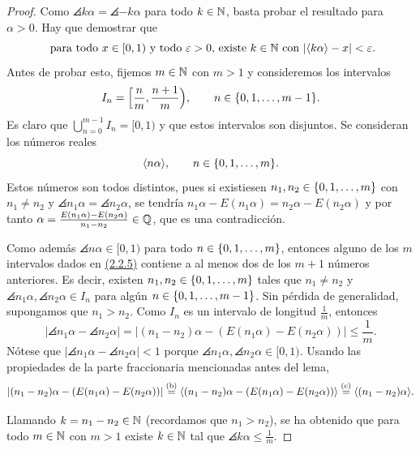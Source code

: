 \documentclass[a4paper, 12pt]{book}
\begin{document}
\begin{proof}
    Como $\angles{k\alpha} = \angles{-k\alpha}$ para todo $k \in \mathbb N$, basta probar el resultado para $\alpha > 0$. Hay que demostrar que 
    \begin{equation}\label{2.2.4}
    \textup{ para todo } x \in [0,1) \textup{ y todo } \varepsilon > 0 \textup{, existe } k \in \mathbb N \textup{ con } |\langle k\alpha \rangle-x|<\varepsilon.
    \end{equation}
    Antes de probar esto, fijemos $m \in \mathbb N$ con $m > 1$ y consideremos los intervalos
    \begin{equation}\label{2.2.5}
        I_n = \Bigl[\frac{n}{m},\frac{n+1}{m}\Bigr), \qquad n \in \{0,1,\mathellipsis,m-1\}.
    \end{equation}
    Es claro que $\bigcup_{n=0}^{m-1}I_n = [0,1)$ y que estos intervalos son disjuntos. Se consideran los números reales
    \[\langle n\alpha \rangle, \qquad n \in \{0,1,\mathellipsis,m\}.\]
    Estos números son todos distintos, pues si existiesen $n_1,n_2\in\{0,1,\mathellipsis,m\}$ con $n_1 \neq n_2$ y $\angles{n_1\alpha} = \angles{n_2\alpha}$, se tendría $n_1\alpha-E(n_1\alpha) = n_2\alpha-E(n_2\alpha)$ y por tanto $\alpha = \frac{E(n_1\alpha)-E(n_2\alpha)}{n_1-n_2} \in \mathbb Q$, que es una contradicción.
    
    Como además $\angles{n\alpha}\in[0,1)$ para todo $n \in \{0,1,\mathellipsis,m\}$, entonces alguno de los $m$ intervalos dados en \hyperref[2.2.5]{(2.2.5)} contiene a al menos dos de los $m+1$ números anteriores. Es decir, existen  $n_1,n_2 \in \{0,1,\mathellipsis,m\}$ tales que $n_1 \neq n_2$ y $\angles{n_1\alpha},\angles{n_2\alpha} \in I_n$ para algún $n \in \{0,1,\mathellipsis,m-1\}$. Sin pérdida de generalidad, supongamos que $n_1 > n_2$. Como $I_n$ es un intervalo de longitud $\frac{1}{m}$, entonces
    \[|\angles{n_1\alpha}-\angles{n_2\alpha}| = |(n_1-n_2)\alpha -(E(n_1\alpha)-E(n_2\alpha))| \leq \frac{1}{m}.\]
    Nótese que $|\angles{n_1\alpha}-\angles{n_2\alpha}| < 1$ porque $\angles{n_1\alpha},\angles{n_2\alpha} \in [0,1)$. Usando las propiedades de la parte fraccionaria mencionadas antes del lema,
    \[|(n_1-n_2)\alpha -(E(n_1\alpha)-E(n_2\alpha))| \overset{(\textup{b})}{=} \langle (n_1-n_2)\alpha -(E(n_1\alpha)-E(n_2\alpha)) \rangle  \overset{(\textup{c})}{=} \langle (n_1-n_2)\alpha \rangle.\]

    Llamando $k = n_1-n_2 \in \mathbb N$ (recordamos que $n_1>n_2$), se ha obtenido que para todo $m \in \mathbb N$ con $m>1$ existe $k \in \mathbb N$ tal que $\angles{k\alpha} \leq \frac{1}{m}$.
    

\end{proof}
\end{document}
